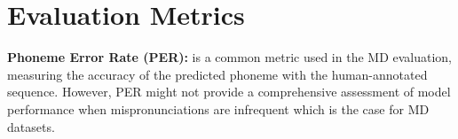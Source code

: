 \documentclass[11pt]{article}
\begin{document}




\section{Evaluation Metrics}
\noindent \textbf{Phoneme Error Rate (PER):} is a common metric used in the MD evaluation, measuring the accuracy of the predicted phoneme with the human-annotated sequence. However, PER might not provide a comprehensive assessment of model performance when mispronunciations are infrequent which is the case for MD datasets. 



\end{document}
